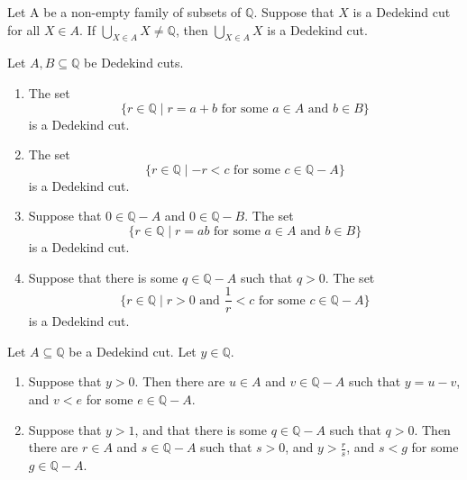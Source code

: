 \begin{lemma} %
	Let A be a non-empty family of subsets of $\mathbb{Q}$. Suppose that $X$ is a Dedekind cut for all $X \in A$. If $\bigcup_{X \in A} X \neq \mathbb{Q}$, then $\bigcup_{X \in A} X$ is a Dedekind cut.
\end{lemma}

\begin{lemma} %
	\label{cuts:l:real_req}
	Let $A, B \subseteq \mathbb{Q}$ be Dedekind cuts.
	\begin{enumerate}
		\item \label{cuts:l:real_req:1}
		      The set
		      \[
			      \{ r \in \mathbb{Q} \mid r=a + b \text{ for some } a \in A \text{ and } b \in B \}
		      \]
		      is a Dedekind cut.
		\item \label{cuts:l:real_req:2}
		      The set
		      \[
			      \{ r \in \mathbb{Q} \mid -r < c \text{ for some } c \in \mathbb{Q} - A \}
		      \]
		      is a Dedekind cut.
		\item \label{cuts:l:real_req:3}
		      Suppose that $0 \in \mathbb{Q} - A$ and $0 \in \mathbb{Q} - B$. The set
		      \[
			      \{ r \in \mathbb{Q} \mid r = a b \text{ for some } a \in A \text{ and } b \in B \}
		      \]
		      is a Dedekind cut.
		\item \label{cuts:l:real_req:4}
		      Suppose that there is some $q \in \mathbb{Q} - A$ such that $q > 0$. The set
		      \[
			      \{ r \in \mathbb{Q} \mid r > 0 \text{ and } \frac{1}{r} < c \text{ for some } c \in \mathbb{Q} - A \}
		      \]
		      is a Dedekind cut.
	\end{enumerate}
\end{lemma}

\begin{lemma} %
	\label{cuts:l:aprops}
	Let $A \subseteq \mathbb{Q}$ be a Dedekind cut. Let $y \in \mathbb{Q}$.
	\begin{enumerate}
		\item Suppose that $y > 0$. Then there are $u \in A$ and $v \in \mathbb{Q}-A$ such that $y = u - v$, and $v < e$ for some $e \in \mathbb{Q} - A$.
		\item Suppose that $y > 1$, and that there is some $q \in \mathbb{Q} - A$ such that $q > 0$. Then there are $r \in A$ and $s \in \mathbb{Q} - A$ such that $s > 0$, and $y > \frac{r}{s}$, and $s < g$ for some $g \in \mathbb{Q} - A$.
	\end{enumerate}
\end{lemma}


